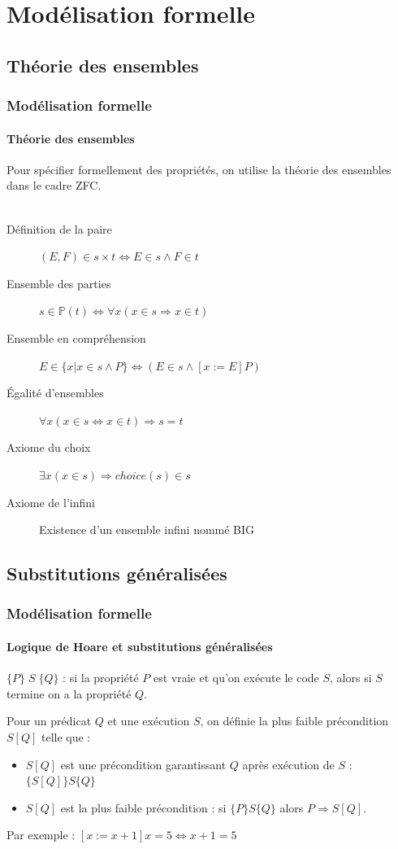 \documentclass[11pt,a4paper,xcolor=table, handout]{beamer} %
\begin{document}
%
%
\frame{\tableofcontents}

\section{Modélisation formelle}
\subsection{Théorie des ensembles}
\begin{frame}
\frametitle{Modélisation formelle}
\framesubtitle{Théorie des ensembles}
Pour spécifier formellement des propriétés, on utilise la théorie des ensembles dans le cadre ZFC.
\\~\pause
\begin{description}
\item[Définition de la paire] $(E, F) \in s \times t \Leftrightarrow E \in s \wedge F \in t$
\item[Ensemble des parties] $s \in \mathbb{P}(t) \Leftrightarrow \forall x (x \in s \Rightarrow x \in t)$
\item[Ensemble en compréhension] $E \in \{ x | x \in s \wedge P \} \Leftrightarrow (E \in s \wedge [x:= E] P)$
\item[Égalité d'ensembles] $\forall x (x \in s \Leftrightarrow x \in t) \Rightarrow s = t$
\item[Axiome du choix] $\exists x  (x \in s) \Rightarrow choice(s) \in s$
\item[Axiome de l'infini] Existence d'un ensemble infini nommé BIG
\end{description}
\end{frame}

\subsection{Substitutions généralisées}
\begin{frame}
\frametitle{Modélisation formelle}
\framesubtitle{Logique de Hoare et substitutions généralisées}
\begin{definition}
$ \{P\}\;S\;\{Q\} $ : si la propriété $P$ est vraie et qu'on exécute le code $S$, alors si $S$ termine on a la propriété $Q$.
\end{definition}
\pause
\begin{definition}
Pour un prédicat $Q$ et une exécution $S$, on définie la plus faible précondition $S[Q]$ telle que :
\begin{itemize}
\item $S[Q]$ est une précondition garantissant $Q$  après exécution de $S$ : $ \{ S[Q] \} S \{ Q\}$
\item $S[Q]$  est la plus faible précondition : si $\{ P \} S \{ Q \}$ alors $P \Rightarrow S[Q]$.
\end{itemize}
\end{definition}
Par exemple : $[x := x+1] x = 5 \Leftrightarrow x+1 = 5$
\end{frame}
\end{document}
